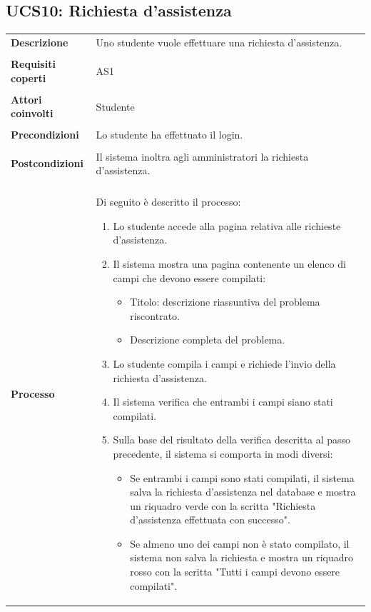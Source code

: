 \documentclass[10pt,a4paper]{report}
\begin{document}
	\subsection{UCS10: Richiesta d'assistenza}
	\begin{tabular}{lp{}}
		\textbf{Descrizione}&Uno studente vuole effettuare una richiesta d'assistenza.\\
		\\
		\textbf{Requisiti coperti}&AS1\\
		\\
		\textbf{Attori coinvolti}&Studente\\
		\\
		\textbf{Precondizioni}&Lo studente ha effettuato il login.\\
		\\
		\textbf{Postcondizioni}&Il sistema inoltra agli amministratori la richiesta d'assistenza.\\
		\\
		\textbf{Processo}&Di seguito è descritto il processo:
		\begin{enumerate}
			\item Lo studente accede alla pagina relativa alle richieste d'assistenza.
			\item Il sistema mostra una pagina contenente un elenco di campi che devono essere compilati:
			\begin{itemize}
				\item Titolo: descrizione riassuntiva del problema riscontrato.
				\item Descrizione completa del problema.
			\end{itemize}
			\item Lo studente compila i campi e richiede l'invio della richiesta d'assistenza.
			\item Il sistema verifica che entrambi i campi siano stati compilati.
			\item Sulla base del risultato della verifica descritta al passo precedente, il sistema si comporta in modi diversi:
			\begin{itemize}
				\item Se entrambi i campi sono stati compilati, il sistema salva la richiesta d'assistenza nel database e mostra un riquadro verde con la scritta "Richiesta d'assistenza effettuata con successo".
				\item Se almeno uno dei campi non è stato compilato, il sistema non salva la richiesta e mostra un riquadro rosso con la scritta "Tutti i campi devono essere compilati".
			\end{itemize}
		\end{enumerate}
	\end{tabular}
\end{document}
